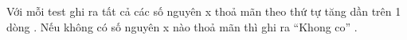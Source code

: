 Với mỗi test ghi ra tất cả các số nguyên x thoả mãn theo thứ tự tăng dần trên 1 dòng . Nếu không có số nguyên x nào thoả mãn thì ghi ra “Khong co” .